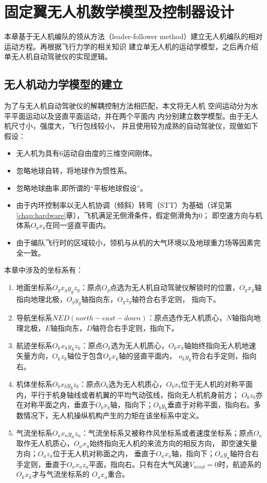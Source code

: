 %
%
%
%

\chapter{固定翼无人机数学模型及控制器设计}
\label{chap:formation_dynamic_equ}
本章基于无人机编队的领从方法（leader-follower method）建立无人机编队的相对运动方程。再根据飞行力学的相关知识
建立单无人机的运动学模型，之后再介绍单无人机自动驾驶仪的实现逻辑。
\section{无人机动力学模型的建立}
为了与无人机自动驾驶仪的解耦控制方法相匹配，本文将无人机
空间运动分为水平平面运动以及竖直平面运动，并在两个平面内
内分别建立数学模型。由于无人机尺寸小，强度大，飞行包线较小，
并且使用较为成熟的自动驾驶仪，现做如下假设：
\begin{itemize}
    \item 无人机为具有6运动自由度的三维空间刚体。
    \item 忽略地球自转，将地球作为惯性系。
    \item 忽略地球曲率,即所谓的“平板地球假设”。\cite{Wusentang2013}
    \item 由于内环控制率以无人机协调（倾斜）转弯（STT）为基础（详见第\ref{chap:hardware}章），飞机满足无侧滑条件，假定侧滑角为0；
        即空速方向与机体系$O_bx_b$在同一竖直平面内。
    \item 由于编队飞行时的区域较小，领机与从机的大气环境以及地球重力场等因素完全一致。
\end{itemize}
本章中涉及的坐标系有：
\begin{enumerate}
    \item 地面坐标系$O_gx_gy_gz_g$：原点$O_g$点选为无人机自动驾驶仪解锁时的位置，$O_gx_g$轴指向地理北极，$O_gy_g$轴指向东，$O_gz_g$轴符合右手定则，
        指向下。
    \item 导航坐标系$NED(north-east-down)$：原点选作无人机质心，$N$轴指向地理北极，$E$轴指向东，$D$轴符合右手定则，指向下。
    \item 航迹坐标系$O_kx_ky_kz_k$：原点$O_k$选为无人机质心，$O_kx_k$轴始终指向无人机地速矢量方向，$O_kz_k$轴位于包含$O_kx_k$轴的竖直平面内，
        $o_ky_k$符合右手定则，指向右。
    \item 机体坐标系$O_bx_by_bz_b$：原点$O_b$选为无人机质心，$O_bx_b$位于无人机的对称平面内，平行于机身轴线或者机翼的平均气动弦线，指向无人机机身前方；
        $O_bz_b$亦在对称平面之内，垂直于$O_bx_b$轴，指向下；$O_by_b$垂直于对称平面，指向右。多数情况下，无人机操纵机构产生的力矩在该坐标系中定义。
    \item 气流坐标系$O_ax_ay_az_a$：气流坐标系又被称作风坐标系或者速度坐标系；原点$O_a$取作无人机质心，$O_ax_a$始终指向无人机的来流方向的相反方向，
        即空速矢量方向；$O_az_a$位于无人机对称面之内，
        垂直于$O_ax_a$轴，指向下；$O_ay_a$轴符合右手定则，垂直于$O_ax_az_a$平面，指向右。只有在大气风速$V_{wind}=0$时，航迹系的$O_kx_k$才与气流坐标系的
        $O_ax_a$重合。
\end{enumerate}
